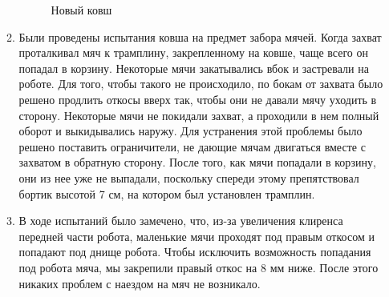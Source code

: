 \begin{enumerate}
\begin{enumerate}
\begin{figure}[H]
\begin{minipage}[h]{0.31\linewidth}
	  	\end{minipage}
	  	\vfill
	    \caption{Новый ковш}
	  \end{figure}
      
      \item Были проведены испытания ковша на предмет забора мячей. Когда захват проталкивал мяч к трамплину, закрепленному на ковше, чаще всего он попадал в корзину. Некоторые мячи закатывались вбок и застревали на роботе. Для того, чтобы такого не происходило, по бокам от захвата было решено продлить откосы вверх так, чтобы они не давали мячу уходить в сторону. Некоторые мячи не покидали захват, а проходили в нем полный оборот и выкидывались наружу. Для устранения этой проблемы было решено поставить ограничители, не дающие мячам двигаться вместе с захватом в обратную сторону. После того, как мячи попадали в корзину, они из нее уже не выпадали, поскольку спереди этому препятствовал бортик высотой 7 см, на котором был установлен трамплин.
      
      \item В ходе испытаний было замечено, что, из-за увеличения клиренса передней части робота, маленькие мячи проходят под правым откосом и попадают под днище робота. Чтобы исключить возможность попадания под робота мяча, мы закрепили правый откос на 8 мм ниже. После этого никаких проблем с наездом на мяч не возникало.
      

\end{enumerate}
\end{enumerate}
